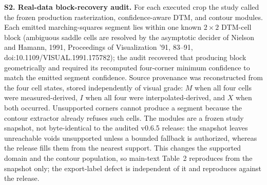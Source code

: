 \documentclass[11pt]{article}
\begin{document}
\vspace{4mm}
\noindent\textbf{S2. Real-data block-recovery audit.} For each executed crop the study called the frozen production rasterization, confidence-aware DTM, and contour modules. Each emitted marching-squares segment lies within one known $2\times2$ DTM-cell block (ambiguous saddle cells are resolved by the asymptotic decider of Nielson and Hamann, 1991, Proceedings of Visualization '91, 83--91, doi:10.1109/VISUAL.1991.175782); the audit recovered that producing block geometrically and required its recomputed four-corner minimum confidence to match the emitted segment confidence. Source provenance was reconstructed from the four cell states, stored independently of visual grade: $M$ when all four cells were measured-derived, $I$ when all four were interpolated-derived, and $X$ when both occurred. Unsupported corners cannot produce a segment because the contour extractor already refuses such cells. The modules are a frozen study snapshot, not byte-identical to the audited v0.6.5 release: the snapshot leaves unreachable voids unsupported unless a bounded fallback is authorized, whereas the release fills them from the nearest support. This changes the supported domain and the contour population, so main-text Table~2 reproduces from the snapshot only; the export-label defect is independent of it and reproduces against the release.
\end{document}
